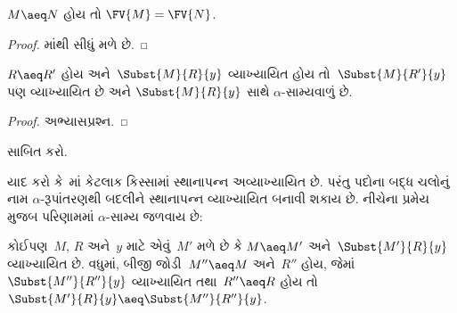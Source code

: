 \begin{thm}
  $M \aeq N$ હોય તો $\FV{M} = \FV{N}$.
\end{thm}

\begin{proof}
  માંથી સીધું મળે છે.
\end{proof}

\begin{lem}
  $R \aeq R'$ હોય અને~$\Subst{M}{R}{y}$ વ્યાખ્યાયિત હોય
  તો~$\Subst{M}{R'}{y}$ પણ વ્યાખ્યાયિત છે અને
  $\Subst{M}{R}{y}$ સાથે $\alpha$-સામ્યવાળું છે.
\end{lem}

\begin{proof}
  અભ્યાસપ્રશ્ન.
\end{proof}

\begin{prob}
   સાબિત કરો.
\end{prob}

યાદ કરો કે~માં કેટલાક કિસ્સામાં સ્થાનાપન્ન
અવ્યાખ્યાયિત છે. પરંતુ પદોના બદ્ધ ચલોનું નામ
$\alpha$-રૂપાંતરણથી બદલીને સ્થાનાપન્ન વ્યાખ્યાયિત બનાવી
શકાય છે. નીચેના પ્રમેય મુજબ પરિણામમાં $\alpha$-સામ્ય
જળવાય છે:

\begin{thm}
  કોઈપણ~$M$, $R$ અને~$y$ માટે એવું~$M'$ મળે છે કે
  $M \aeq M'$ અને~$\Subst{M'}{R}{y}$ વ્યાખ્યાયિત છે.
  વધુમાં, બીજી જોડી~$M'' \aeq M$ અને~$R''$ હોય, જેમાં
  $\Subst{M''}{R''}{y}$ વ્યાખ્યાયિત તથા~$R'' \aeq R$
  હોય તો
  $\Subst{M'}{R}{y} \aeq \Subst{M''}{R''}{y}$.
\end{thm}

